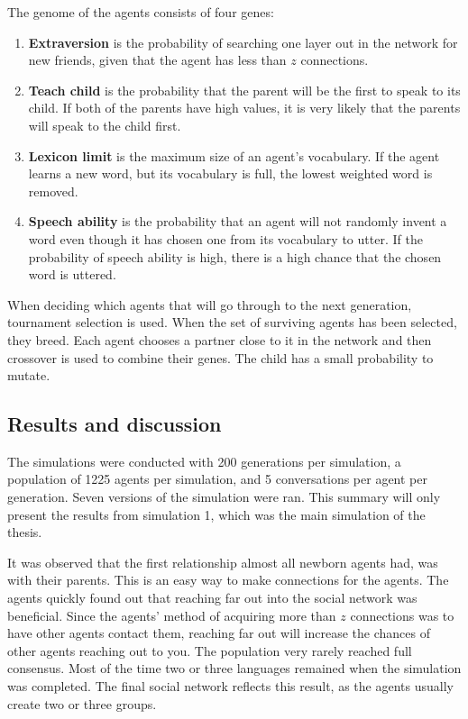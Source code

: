 The genome of the agents consists of four genes:
\begin{enumerate}
    \item \textbf{Extraversion} is the probability of searching one layer out in the network for new friends, given that the agent has less than $z$ connections.
    
    \item \textbf{Teach child} is the probability that the parent will be the first to speak to its child. If both of the parents have high values, it is very likely that the parents will speak to the child first.
    
    \item \textbf{Lexicon limit} is the maximum size of an agent's vocabulary. If the agent learns a new word, but its vocabulary is full, the lowest weighted word is removed.
    
    \item \textbf{Speech ability} is the probability that an agent will not randomly invent a word even though it has chosen one from its vocabulary to utter. If the probability of speech ability is high, there is a high chance that the chosen word is uttered.
\end{enumerate}

When deciding which agents that will go through to the next generation, tournament selection is used. When the set of surviving agents has been selected, they breed. Each agent chooses a partner close to it in the network and then crossover is used to combine their genes. The child has a small probability to mutate. 

\subsection{Results and discussion}
The simulations were conducted with 200 generations per simulation, a population of 1225 agents per simulation, and 5 conversations per agent per generation. Seven versions of the simulation were ran. This summary will only present the results from simulation 1, which was the main simulation of the thesis. 

It was observed that the first relationship almost all newborn agents had, was with their parents. This is an easy way to make connections for the agents. The agents quickly found out that reaching far out into the social network was beneficial. Since the agents' method of acquiring more than $z$ connections was to have other agents contact them, reaching far out will increase the chances of other agents reaching out to you. The population very rarely reached full consensus. Most of the time two or three languages remained when the simulation was completed. The final social network reflects this result, as the agents usually create two or three groups.

